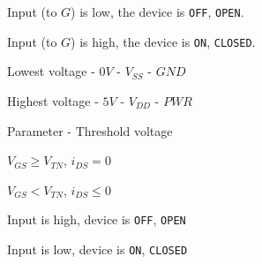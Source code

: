 \documentclass[a4paper,12pt]{article}
\begin{document}
Input (to $G$) is low, the device is \verb!OFF!, \verb!OPEN!.

Input (to $G$) is high, the device is \verb!ON!, \verb!CLOSED!.


Lowest voltage - $0V$ - $V_{SS}$ - $GND$

Highest voltage - $5V$ - $V_{DD}$ - $PWR$

\begin{table}[hbtp]


\end{table}

Parameter - Threshold voltage

$V_{GS} \geq V_{TN}$, $i_{DS} = 0$

$V_{GS} < V_{TN}$, $i_{DS} \leq 0$

Input is high, device is \verb!OFF!, \verb!OPEN!

Input is low, device is \verb!ON!, \verb!CLOSED!

\begin{table}[hbtp]


\end{table}
\end{document}
